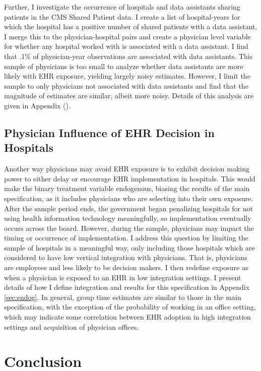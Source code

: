 \documentclass[11pt]{article}
\begin{document}
Further, I investigate the occurrence of hospitals and data assistants sharing patients in the CMS Shared Patient data. I create a list of hospital-years for which the hospital has a positive number of shared patients with a data assistant. I merge this to the physician-hospital pairs and create a physician level variable for whether any hospital worked with is associated with a data assistant. I find that .1\% of physician-year observations are associated with data assistants. This sample of physicians is too small to analyze whether data assistants are more likely with EHR exposure, yielding largely noisy estimates. However, I limit the sample to only physicians not associated with data assistants and find that the magnitude of estimates are similar, albeit more noisy. Details of this analysis are given in Appendix (). 



\subsection{Physician Influence of EHR Decision in Hospitals}

Another way physicians may avoid EHR exposure is to exhibit decision making power to either delay or encourage EHR implementation in hospitals. This would make the binary treatment variable endogenous, biasing the results of the main specification, as it includes physicians who are selecting into their own exposure. After the sample period ends, the government began penalizing hospitals for not using health information technology meaningfully, so implementation eventually occurs across the board. However, during the sample, physicians may impact the timing or occurrence of implementation. I address this question by limiting the sample of hospitals in a meaningful way, only including those hospitals which are considered to have low vertical integration with physicians. That is, physicians are employees and less likely to be decision makers. I then redefine exposure as when a physician is exposed to an EHR in low integration settings. I present details of how I define integration and results for this specification in Appendix \ref{sec:endog}. In general, group time estimates are similar to those in the main specification, with the exception of the probability of working in an office setting, which may indicate some correlation between EHR adoption in high integration settings and acquisition of physician offices. 


\section{Conclusion}
\end{document}
